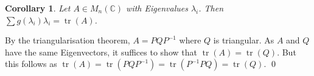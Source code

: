 \documentclass[
]{article}
\newtheorem{corollary}{Corollary}[theorem]
\theoremstyle{definition}
\begin{document}
\begin{corollary}
  Let \(A \in M_n(\mathbb{C})\) with Eigenvalues \(\lambda_i\). Then 
  \(\sum g(\lambda_i)\lambda_i = \mathop{\mathrm{tr}}(A)\).
\end{corollary}
\proof

By the triangularisation theorem, \(A = PQP^{-1}\) where \(Q\) is
triangular. As \(A\) and \(Q\) have the same Eigenvectors, it suffices
to show that \(\mathop{\mathrm{tr}}(A) = \mathop{\mathrm{tr}}(Q)\). But
this follows as
\(\mathop{\mathrm{tr}}(A) = \mathop{\mathrm{tr}}(PQP^{-1}) =  \mathop{\mathrm{tr}}(P^{-1}PQ) = \mathop{\mathrm{tr}}(Q)\).
\qed
\end{document}
